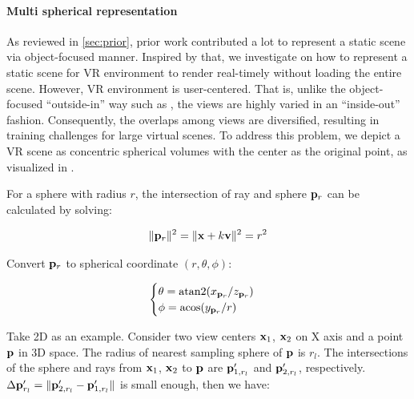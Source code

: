 \paragraph{Multi spherical representation}
As reviewed in \autoref{sec:prior}, prior work contributed a lot to represent a static scene via object-focused manner. Inspired by that, we investigate on how to represent a static scene for VR environment to render real-timely without loading the entire scene. However, VR environment is user-centered. That is, unlike the object-focused ``outside-in'' way such as \cite{mildenhall2020nerf}, the views are highly varied in an ``inside-out'' fashion. 
Consequently, the overlaps among views are diversified, resulting in training challenges for large virtual scenes.
To address this problem, we depict a VR scene as concentric spherical volumes with the center as the original point, as visualized in . 

    \label{fig:method:coordinate}

 For a sphere with radius $r$, the intersection of ray and sphere $\mathbf{p}_r$ can be calculated by solving:

\begin{equation}
    \|\mathbf{p}_r\|^2=\|\mathbf{x} + k\mathbf{v}\|^2=r^2
\end{equation}

Convert $\mathbf{p}_r$ to spherical coordinate $(r, \theta, \phi)$:

\begin{equation}
    \begin{cases}
        \theta = \mathrm{atan2}(x_{\mathbf{p}_r}/z_{\mathbf{p}_r})\\
        \phi = \mathrm{acos}(y_{\mathbf{p}_r} / r)
    \end{cases}
\end{equation}

 Take 2D as an example. Consider two view centers $\mathbf{x}_1$, $\mathbf{x}_2$ on X axis and a point $\mathbf{p}$ in 3D space. The radius of nearest sampling sphere of $\mathbf{p}$ is $r_l$. The intersections of the sphere and rays from $\mathbf{x}_1$, $\mathbf{x}_2$ to $\mathbf{p}$ are $\mathbf{p}'_{1,r_l}$ and $\mathbf{p}'_{2,r_l}$, respectively. $\Delta\mathbf{p}'_{r_l}=\|\mathbf{p}'_{2,r_l}-\mathbf{p}'_{1,r_l}\|$ is small enough, then we have:

